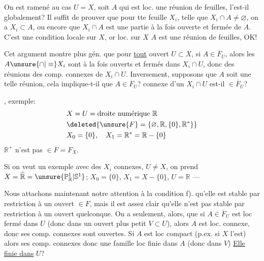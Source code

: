 On est ramené au cas $U=X$, soit $A$ qui est loc. une réunion de feuilles, l'est-il globalement? Il suffit de prouver que pour tte feuille $X_i$, telle que $X_i\cap A\ne\varnothing$, on a $X_i\subset A$, ou encore que $X_i\cap A$ est une partie à la fois ouverte et fermée de $A$. C'est une condition locale sur $X$, or loc. sur $X$ $A$ est  une réunion de feuilles, OK!

Cet argument montre plus gén. que pour \uline{tout} ouvert $U\subset X$, si $A\in\overline F_U$, alors les $A\unsure{\cap|\equiv} X_i$ sont à la fois ouverts et fermés dans $X_i\cap U$, donc des réunions des comp. connexes de $X_i\cap U$.  Inversement, supposons que $A$ soit une telle réunion, cela implique-t-il que $A\in\overline F_U$?  connexe d'un $X_i\cap U$ est-il $\in\overline F_U$?

, exemple:
\[
\begin{aligned}
&X=U=\text{droite numérique }\mathbb R\\
&\deleted{\unsure{F}=\{\varnothing,\mathbb R,\{0\},\mathbb R^*\}}\\
&X_0=\{0\},\quad X_1=\mathbb R^*=\mathbb R-\{0\}
\end{aligned}
\]
$\mathbb R^+$ n'est pas $\in\overline F=F_X$.


Si on veut un exemple avec des $X_i$ connexes, $U\ne X$, on prend $X=\widehat{\mathbb R}=\unsure{\mathbb P^1_{\mathbb R}|\mathbb S^1}$;  $X_0=\{0\}$, $X_1=X-\{0\}$, $U=\mathbb R$ ---

Nous attachons maintenant notre attention à la condition f).  qu'elle  est stable par restriction à un ouvert $\in F$, mais il est assez clair qu'elle n'est pas stable par restriction à un ouvert quelconque. On a seulement, alors, que si $A\in\overline F_U$ est loc fermé dans $U$ (donc  dans un ouvert plus petit $V\subset U$), alors $A$ est loc. connexe,  donc ses comp. connexes sont ouvertes. Si $A$ est loc compact (p.ex. si $X$ l'est) alors ses comp. connexes  donc une famille loc finie dans $A$ (donc dans $V$)  \uline{Elle}  \uline{ finie dans} $U$?

